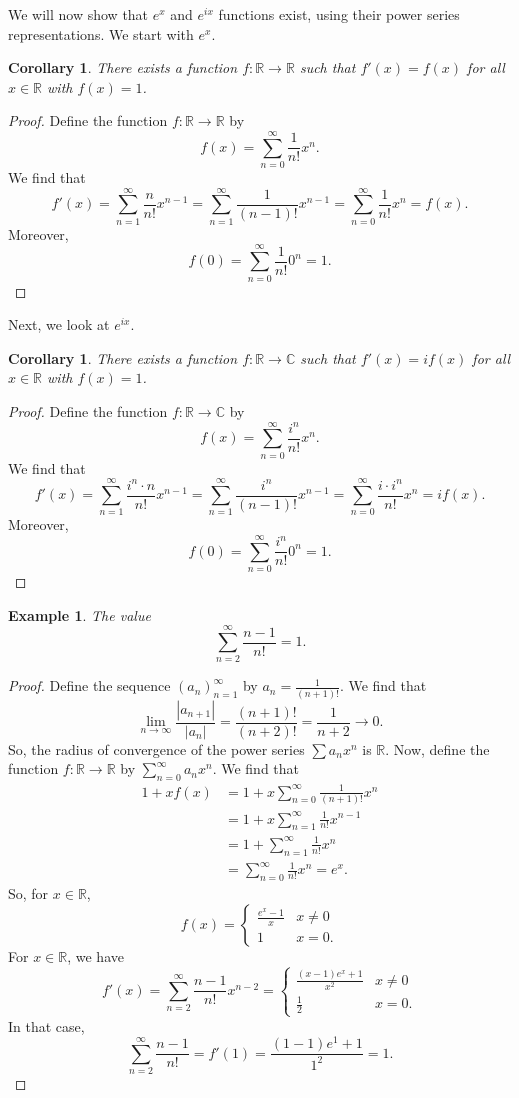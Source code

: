 \documentclass[a4paper, openany]{memoir}
\theoremstyle{definition}
\theoremstyle{plain}
\newtheorem{corollary}[definition]{Corollary}
\newtheorem{example}[definition]{Example}
\begin{document}
We will now show that $e^x$ and $e^{ix}$ functions exist, using their power series representations. We start with $e^x$.
\begin{corollary}
There exists a function $f: \mathbb{R} \to \mathbb{R}$ such that $f'(x) = f(x)$ for all $x \in \mathbb{R}$ with $f(x) = 1$.
\end{corollary}
\begin{proof}
Define the function $f: \mathbb{R} \to \mathbb{R}$ by
\[f(x) = \sum_{n=0}^{\infty} \frac{1}{n!} x^n.\]
We find that
\[f'(x) = \sum_{n=1}^{\infty} \frac{n}{n!} x^{n-1} = \sum_{n=1}^{\infty} \frac{1}{(n-1)!} x^{n-1} = \sum_{n=0}^{\infty} \frac{1}{n!} x^n = f(x).\]
Moreover,
\[f(0) = \sum_{n=0}^{\infty} \frac{1}{n!} 0^n = 1.\]
\end{proof}
\noindent Next, we look at $e^{ix}$.
\begin{corollary}
There exists a function $f: \mathbb{R} \to \mathbb{C}$ such that $f'(x) = if(x)$ for all $x \in \mathbb{R}$ with $f(x) = 1$.
\end{corollary}
\begin{proof}
Define the function $f: \mathbb{R} \to \mathbb{C}$ by
\[f(x) = \sum_{n=0}^{\infty} \frac{i^n}{n!} x^n.\]
We find that
\[f'(x) = \sum_{n=1}^{\infty} \frac{i^n \cdot n}{n!} x^{n-1} = \sum_{n=1}^{\infty} \frac{i^n}{(n-1)!} x^{n-1} = \sum_{n=0}^{\infty} \frac{i \cdot i^n}{n!} x^n = if(x).\]
Moreover,
\[f(0) = \sum_{n=0}^{\infty} \frac{i^n}{n!} 0^n = 1.\]
\end{proof}

\begin{example}
The value
\[\sum_{n=2}^{\infty} \frac{n-1}{n!} = 1.\]
\end{example}
\begin{proof}
Define the sequence $(a_n)_{n=1}^{\infty}$ by $a_n = \frac{1}{(n+1)!}$. We find that
\[\lim_{n \to \infty} \frac{|a_{n+1}|}{|a_n|} = \frac{(n+1)!}{(n+2)!} = \frac{1}{n+2} \to 0.\]
So, the radius of convergence of the power series $\sum a_n x^n$ is $\mathbb{R}$. Now, define the function $f: \mathbb{R} \to \mathbb{R}$ by $\sum_{n=0}^{\infty} a_n x^n$. We find that
\begin{align*}
    1 + xf(x) &= 1 + x\sum_{n=0}^{\infty} \frac{1}{(n+1)!} x^n \\
    &= 1 + x\sum_{n=1}^{\infty} \frac{1}{n!} x^{n-1} \\
    &= 1 + \sum_{n=1}^{\infty} \frac{1}{n!} x^n \\
    &= \sum_{n=0}^{\infty} \frac{1}{n!} x^n = e^x.
\end{align*}
So, for $x \in \mathbb{R}$,
\[f(x) = \begin{cases}
\frac{e^x - 1}{x} & x \neq 0 \\
1 & x = 0.
\end{cases}\]
For $x \in \mathbb{R}$, we have
\[f'(x) = \sum_{n=2}^{\infty} \frac{n-1}{n!} x^{n-2} = \begin{cases}
\frac{(x-1) e^x + 1}{x^2} & x \neq 0 \\
\frac{1}{2} & x = 0.
\end{cases}\]
In that case,
\[\sum_{n=2}^{\infty} \frac{n-1}{n!} = f'(1) = \frac{(1-1) e^1 + 1}{1^2} = 1.\]
\end{proof}
\end{document}
